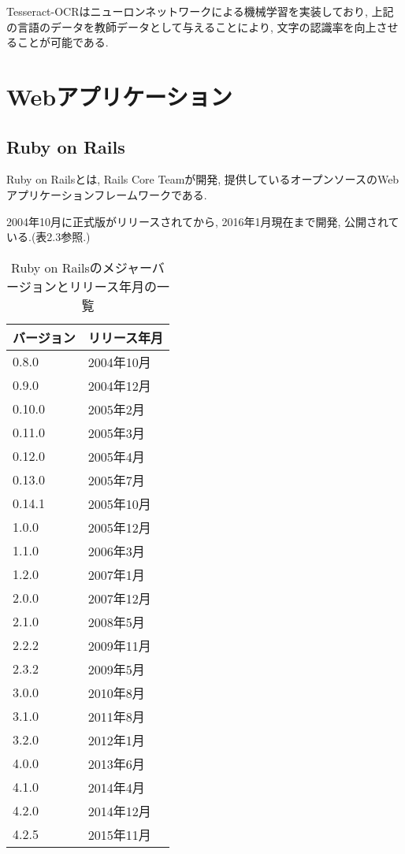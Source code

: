 Tesseract-OCRはニューロンネットワークによる機械学習を実装しており, 上記の言語のデータを教師データとして与えることにより, 文字の認識率を向上させることが可能である.

\section{Webアプリケーション}
\subsection{Ruby on Rails}
Ruby on Railsとは, Rails Core Teamが開発, 提供しているオープンソースのWebアプリケーションフレームワークである.

2004年10月に正式版がリリースされてから, 2016年1月現在まで開発, 公開されている.(表2.3参照.)

\begin{table}[htb]
\begin{center}
\begin{tabular}{|l|l|} \hline
バージョン & リリース年月 \\ \hline \hline
0.8.0 & 2004年10月 \\ \hline
0.9.0 & 2004年12月 \\ \hline
0.10.0 & 2005年2月 \\ \hline
0.11.0 & 2005年3月 \\ \hline
0.12.0 & 2005年4月 \\ \hline
0.13.0 & 2005年7月 \\ \hline
0.14.1 & 2005年10月 \\ \hline
1.0.0 & 2005年12月 \\ \hline
1.1.0 & 2006年3月 \\ \hline
1.2.0 & 2007年1月 \\ \hline
2.0.0 & 2007年12月 \\ \hline
2.1.0 & 2008年5月 \\ \hline
2.2.2 & 2009年11月 \\ \hline
2.3.2 & 2009年5月 \\ \hline
3.0.0 & 2010年8月 \\ \hline
3.1.0 & 2011年8月 \\ \hline
3.2.0 & 2012年1月 \\ \hline
4.0.0 & 2013年6月 \\ \hline
4.1.0 & 2014年4月 \\ \hline
4.2.0 & 2014年12月 \\ \hline
4.2.5 & 2015年11月 \\ \hline
\end{tabular}
\caption{Ruby on Railsのメジャーバージョンとリリース年月の一覧}
\end{center}
\end{table}

